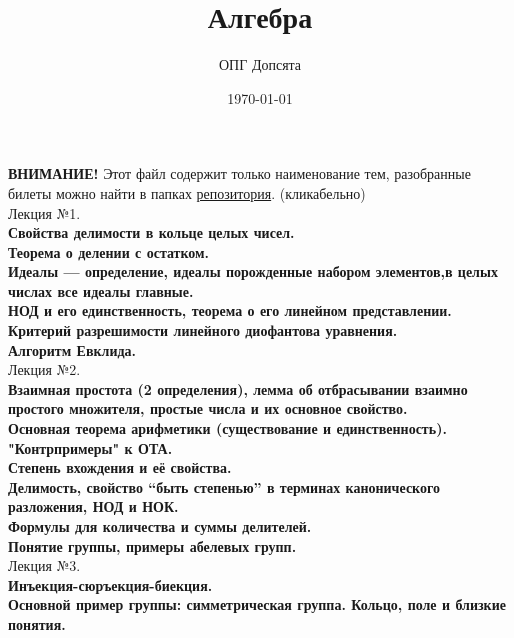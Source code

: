 \documentclass[12pt]{article}
\title{Алгебра}
\author{ОПГ Допсята}
\date{\today}
\begin{document}
\maketitle
\large

\textbf{ВНИМАНИЕ!} Этот файл содержит только наименование тем, разобранные билеты можно найти в папках \href{https://github.com/Win4ap/algebra-exam-2023}{репозитория}. (кликабельно)\\

Лекция №1.\\
\textbf{Свойства делимости в кольце целых чисел.}\\

\textbf{Теорема о делении с остатком.}\\

\textbf{Идеалы — определение, идеалы порожденные набором элементов,в целых числах все идеалы главные.}\\

\textbf{НОД и его единственность, теорема о его линейном представлении.}\\

\textbf{Критерий разрешимости линейного диофантова уравнения.}\\

\textbf{Алгоритм Евклида.}\\

Лекция №2.\\
\textbf{Взаимная простота (2 определения), лемма об отбрасывании взаимно простого множителя, простые числа и их основное свойство.}\\

\textbf{Основная теорема арифметики (существование и единственность).
"Контрпримеры" к ОТА.}\\

\textbf{Степень вхождения и её свойства.}\\

\textbf{Делимость, свойство “быть степенью” в терминах канонического разложения, НОД и НОК.}\\

\textbf{Формулы для количества и суммы делителей.}\\

\textbf{Понятие группы, примеры абелевых групп.}\\

Лекция №3.\\
\textbf{Инъекция-сюръекция-биекция.}\\

\textbf{Основной пример группы: симметрическая группа. Кольцо, поле и близкие понятия.}\\
\end{document}
